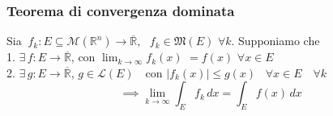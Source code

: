 \documentclass{article} %
\begin{document}
    \subsubsection*{Teorema di convergenza dominata}
    Sia $ \ f_k: E \subseteq \mathcal{M} (\mathbb{R} ^n) \to \overline{\mathbb{R}} , \,\,\,\, f_k \in \mathfrak{M} (E) \,\, \forall k$. Supponiamo che \\ 1. $\exists \, f: E \to \overline{\mathbb{R}} $, con $\lim_{k \to \infty} f_k(x) $ $= f(x)$ $\forall x \in E$ \\ 2. $\exists \, g: E \to \overline{\mathbb{R}} $, $g \in \mathcal{L} (E)$ \,\, con $|f_k(x)| \leq g(x) \,\,\,\,\, \forall x \in E \,\,\,\,\,\, \forall k$
    $$ \implies \lim_{k \to \infty} \int_{E}^{}f_k \,dx = \int_{E}^{}f(x) \,dx $$
  
\end{document}
